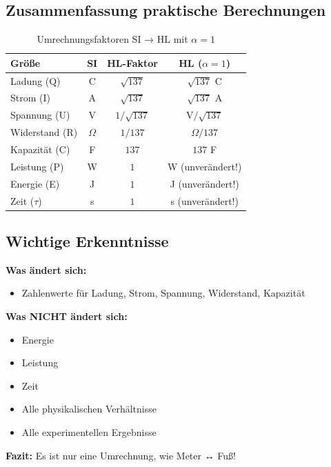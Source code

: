 	\subsection{Zusammenfassung praktische Berechnungen}
	
	\begin{table}[h]
		\centering
		\begin{tabular}{|l|c|c|c|}
			\hline
			\textbf{Größe} & \textbf{SI} & \textbf{HL-Faktor} & \textbf{HL ($\alpha=1$)} \\
			\hline
			Ladung (Q) & C & $\sqrt{137}$ & $\sqrt{137}$ C \\
			Strom (I) & A & $\sqrt{137}$ & $\sqrt{137}$ A \\
			Spannung (U) & V & $1/\sqrt{137}$ & V$/\sqrt{137}$ \\
			Widerstand (R) & $\Omega$ & $1/137$ & $\Omega/137$ \\
			Kapazität (C) & F & $137$ & $137$ F \\
			Leistung (P) & W & $1$ & W (unverändert!) \\
			Energie (E) & J & $1$ & J (unverändert!) \\
			Zeit ($\tau$) & s & $1$ & s (unverändert!) \\
			\hline
		\end{tabular}
		\caption{Umrechnungsfaktoren SI → HL mit $\alpha = 1$}
	\end{table}
	
	\subsection{Wichtige Erkenntnisse}
	
	\begin{tcolorbox}[colback=green!5!white,colframe=green!75!black,title=Kernaussage]
		\textbf{Was ändert sich:}
		\begin{itemize}
			\item Zahlenwerte für Ladung, Strom, Spannung, Widerstand, Kapazität
		\end{itemize}
		
		\textbf{Was NICHT ändert sich:}
		\begin{itemize}
			\item Energie
			\item Leistung
			\item Zeit
			\item Alle physikalischen Verhältnisse
			\item Alle experimentellen Ergebnisse
		\end{itemize}
		
		\textbf{Fazit:} Es ist nur eine Umrechnung, wie Meter ↔ Fuß!
	\end{tcolorbox}
	
